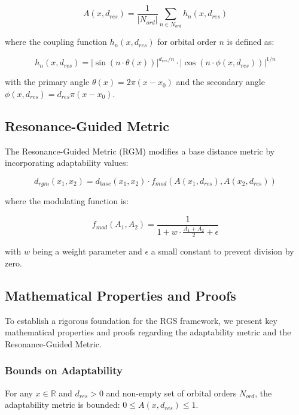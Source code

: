 \documentclass{article}
\begin{document}
\begin{equation}
A(x, d_{res}) = \frac{1}{|N_{ord}|} \sum_{n \in N_{ord}} h_n(x, d_{res})
\end{equation}

where the coupling function $h_n(x, d_{res})$ for orbital order $n$ is defined as:

\begin{equation}
h_n(x, d_{res}) = \left|\sin(n\cdot\theta(x))\right|^{d_{res}/n} \cdot \left|\cos(n\cdot\phi(x, d_{res}))\right|^{1/n}
\end{equation}

with the primary angle $\theta(x) = 2\pi(x - x_0)$ and the secondary angle $\phi(x, d_{res}) = d_{res}\pi(x - x_0)$.

\subsection{Resonance-Guided Metric}
The Resonance-Guided Metric (RGM) modifies a base distance metric by incorporating adaptability values:

\begin{equation}
d_{rgm}(x_1, x_2) = d_{base}(x_1, x_2) \cdot f_{mod}\left(A(x_1, d_{res}), A(x_2, d_{res})\right)
\end{equation}

where the modulating function is:

\begin{equation}
f_{mod}(A_1, A_2) = \frac{1}{1 + w \cdot \frac{A_1 + A_2}{2} + \epsilon}
\end{equation}

with $w$ being a weight parameter and $\epsilon$ a small constant to prevent division by zero.

\subsection{Mathematical Properties and Proofs}
To establish a rigorous foundation for the RGS framework, we present key mathematical properties and proofs regarding the adaptability metric and the Resonance-Guided Metric.

\subsubsection{Bounds on Adaptability}
\begin{theorem}
For any $x \in \mathbb{R}$ and $d_{res} > 0$ and non-empty set of orbital orders $N_{ord}$, the adaptability metric is bounded: $0 \leq A(x, d_{res}) \leq 1$.
\end{theorem}
\end{document}
